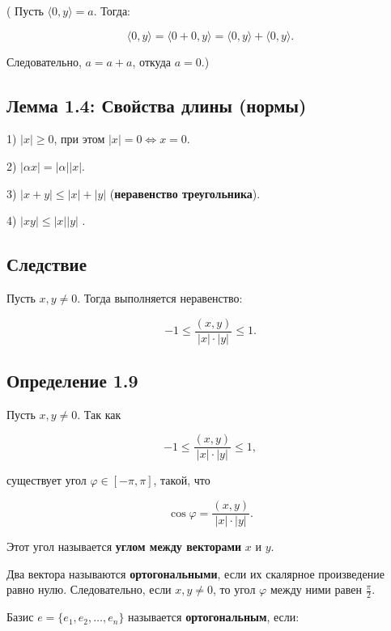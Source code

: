 {( Пусть \( \langle 0, y \rangle = a \). Тогда:

\[
\langle 0, y \rangle = \langle 0 +0, y \rangle = \langle 0, y \rangle + \langle 0, y \rangle.
\]

Следовательно, \( a = a + a \), откуда \( a = 0 \).)

\subsection*{Лемма 1.4: Свойства длины (нормы)}

1) \( |x| \geq 0 \), при этом \( |x| = 0 \iff x = 0 \).

2) \( |\alpha x| = |\alpha| |x| \).

3) \( |x + y| \leq |x| + |y| \) (\textbf{неравенство треугольника}).

4) \( |x y| \leq |x| |y| \) .

\subsection*{Следствие}

Пусть \( x, y \neq 0 \). Тогда выполняется неравенство:



\[
-1 \leq \frac{(x, y)}{|x| \cdot |y|} \leq 1.
\]



\subsection*{Определение 1.9}

Пусть \( x, y \neq 0 \). Так как 



\[
-1 \leq \frac{(x, y)}{|x| \cdot |y|} \leq 1,
\]



существует угол \( \varphi \in [ -\pi, \pi ] \), такой, что 



\[
\cos \varphi = \frac{(x, y)}{|x| \cdot |y|}.
\]

Этот угол называется \textbf{углом между векторами} \( x \) и \( y \).

Два вектора называются \textbf{ортогональными}, если их скалярное произведение равно нулю. Следовательно, если \( x, y \neq 0 \), то угол \( \varphi \) между ними равен \( \frac{\pi}{2} \).

Базис \( e = \{ e_1, e_2, \dots, e_n \} \) называется \textbf{ортогональным}, если:

}
